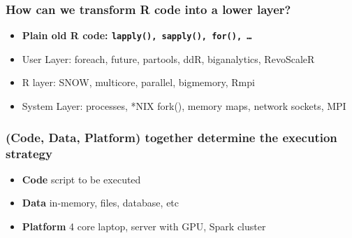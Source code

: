 \documentclass{beamer}
\begin{document}
\begin{frame}

    \frametitle{How can we transform R code into a lower layer?}

\begin{itemize}
    \item \textbf{Plain old R code: \texttt{lapply(), sapply(), for(), \dots}}
\item User Layer: foreach, future, partools, ddR, biganalytics, RevoScaleR
\item R layer: SNOW, multicore, parallel, bigmemory, Rmpi
\item System Layer: processes, *NIX fork(), memory maps, network sockets,
    MPI
\end{itemize}


%
%
%
%
%

\end{frame}
\begin{frame}

    \frametitle{(Code, Data, Platform) together determine the execution
    strategy}

    \begin{itemize}
    \item \textbf{Code} script to be executed
    \item \textbf{Data} in-memory, files, database, etc
    \item \textbf{Platform} 4 core laptop, server with GPU, Spark cluster
    \end{itemize}

\end{frame}
\end{document}
